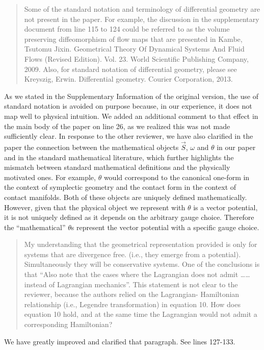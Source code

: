 \documentclass[11pt, executivepaper]{article}
\begin{document}
\begin{quote}
 Some of the standard notation and terminology of differential geometry are not present in the paper. For example, the discussion in the supplementary document from line 115 to 124 could be referred to as the volume preserving diffeomorphism of flow maps that are presented in Kambe, Tsutomu Jixin. Geometrical Theory Of Dynamical Systems And Fluid Flows (Revised Edition). Vol. 23. World Scientific Publishing Company, 2009. Also, for standard notation of differential geometry, please see Kreyszig, Erwin. Differential geometry. Courier Corporation, 2013. 
\end{quote}
As we stated in the Supplementary Information of the original version, the use of standard notation is avoided on purpose because, in our experience, it does not map well to physical intuition. We added an additional comment to that effect in the main body of the paper on line 26, as we realized this was not made sufficiently clear. In response to the other reviewer, we have also clarified in the paper the connection between the mathematical objects $\vec{S}$, $\omega$ and $\theta$ in our paper and in the standard mathematical literature, which further highlights the mismatch between standard mathematical definitions and the physically motivated ones. For example, $\theta$ would correspond to the canonical one-form in the context of symplectic geometry and the contact form in the context of contact manifolds. Both of these objects are uniquely defined mathematically. However, given that the physical object we represent with $\theta$ is a vector potential, it is not uniquely defined as it depends on the arbitrary gauge choice. Therefore the ``mathematical'' $\theta$s represent the vector potential with a specific gauge choice.

 
\begin{quote}
 My understanding that the geometrical representation provided is only for systems that are divergence free. (i.e., they emerge from a potential). Simultaneously they will be conservative systems.  One of the conclusions is that “Also note that the cases where the Lagrangian does not admit ……instead of Lagrangian mechanics”. This statement is not clear to the reviewer, because the authors relied on the Lagrangian- Hamiltonian relationship (i.e., Legendre transformation) in equation 10. How does equation 10 hold, and at the same time the Lagrangian would not admit a corresponding Hamiltonian? 
\end{quote}
We have greatly improved and clarified that paragraph. See lines 127-133.
\end{document}
